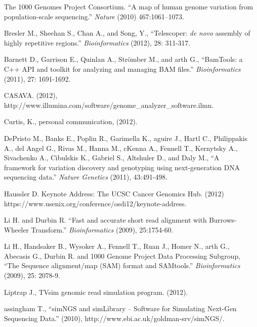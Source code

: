\documentclass[10pt]{article}
\begin{document}
\newpage
\begin{thebibliography}{1}

 The 1000 Genomes Project Consortium. ``A map of human genome variation from population-scale sequencing.'' {\em Nature} (2010) 467:1061–1073.

 Bresler M., Sheehan S., Chan A., and Song, Y., ``Telescoper: {\it de novo} assembly of highly repetitive regions.'' {\em Bioinformatics} (2012), 28: 311-317.

 Barnett D., Garrison E., Quinlan A., Str\"{o}mber M., and arth G., ``BamTools: a C++ API and toolkit for analyzing and managing BAM files.'' {\em Bioinformatics} (2011), 27: 1691-1692.

 CASAVA. (2012), http://www.illumina.com/software/genome\_analyzer\_software.ilmn.

 Curtis, K., personal communication, (2012).

 DePristo M., Banks E., Poplin R., Garimella K., aguire J., Hartl C., Philippakis A., del Angel G., Rivas M., Hanna M., cKenna A., Fennell T., Kernytsky A., Sivachenko A., Cibulskis K., Gabriel S., Altshuler D., and Daly M., ``A framework for variation discovery and genotyping using next-generation DNA sequencing data.'' {\em Nature Genetics} (2011), 43:491-498.

 Haussler D. Keynote Address: The UCSC Cancer Genomics Hub. (2012) https://www.usenix.org/conference/osdi12/keynote-address.

 Li H. and Durbin R. ``Fast and accurate short read alignment with Burrows-Wheeler Transform.'' {\em Bioinformatics} (2009), 25:1754-60.

 Li H., Handsaker B., Wysoker A., Fennell T., Ruan J., Homer N., arth G., Abecasis G., Durbin R. and 1000 Genome Project Data Processing Subgroup, ``The Sequence alignment/map (SAM) format and SAMtools.'' {\em Bioinformatics} (2009), 25: 2078-9.

 Liptrap J., TVsim genomic read simulation program. (2012).

 assingham T., ``simNGS and simLibrary -- Software for Simulating Next-Gen Sequencing Data.'' (2010), http://www.ebi.ac.uk/goldman-srv/simNGS/.


\end{thebibliography}
\end{document}
